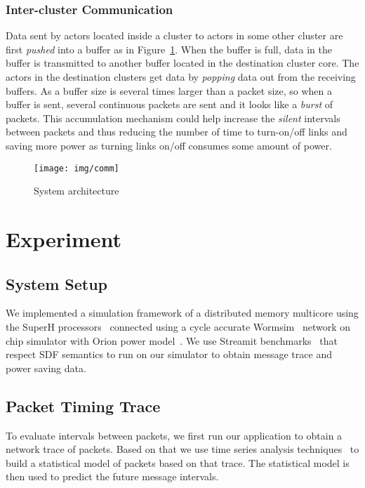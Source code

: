 \documentclass[12pt]{article}
\begin{document}
\subsubsection{Inter-cluster Communication}\label{sec:cluster_comm}
Data sent by actors located inside a cluster to actors in some other
cluster are first \textit{pushed} into a buffer as in Figure~\ref{fig:comm}. When the buffer
is full, data in the buffer is transmitted to another buffer located in the
destination cluster core. The actors in the destination clusters get data by
\textit{popping} data out from the receiving buffers. As a buffer size is
several times larger than a packet size, so when a buffer is sent, several
continuous packets are sent and it looks like a \textit{burst} of packets. This
accumulation mechanism could help increase the \textit{silent} intervals between
packets and thus reducing the number of time to turn-on/off links and saving
more power as turning links on/off consumes some amount of power.


\begin{figure}[ht!]
\centering
\texttt{[image: img/comm]}
\caption{System architecture}\label{fig:comm}
\end{figure}

\section{Experiment}
\subsection{System Setup}
We implemented a simulation framework of a distributed memory multicore using
the SuperH processors~\cite{Stanley-MarbellSunflower} connected using a
cycle accurate Wormsim~\cite{Wormsim} network on chip simulator with Orion power
model~\cite{WangOrion}. We use Streamit benchmarks~\cite{ThiesStreamIt} that
respect SDF semantics to run on our simulator to obtain message trace and power
saving data.

\subsection{Packet Timing Trace}
To evaluate intervals between packets, we first run our application to obtain a
network trace of packets. Based on that we use time series analysis
techniques~\cite{BrillingerTimeSeries, ShumwayTimeSeries} to build a statistical
model of packets based on that trace. The statistical model is then used to
predict the future message intervals.
\end{document}
